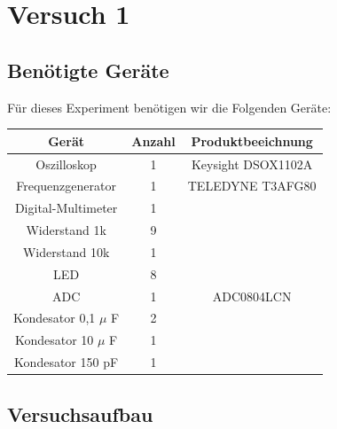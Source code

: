 \chapter{Versuch 1}

\section{Benötigte Geräte}

Für dieses Experiment benötigen wir die Folgenden Geräte:

\begin{tabular}[h]{c|c|c}
    Gerät & Anzahl & Produktbeeichnung\\
    \hline
    Oszilloskop & 1  & Keysight DSOX1102A\\
    \hline
    Frequenzgenerator & 1 & TELEDYNE T3AFG80\\
	\hline 
	Digital-Multimeter & 1 & \\
	\hline 
	Widerstand 1k & 9 &  \\
	\hline 
	Widerstand 10k & 1 &  \\
	\hline
	LED & 8 & \\
	\hline
	ADC & 1 & ADC0804LCN \\
	\hline
	Kondesator 0,1 $\mu$ F & 2 & \\
	\hline
	Kondesator 10 $\mu$ F & 1 & \\
	\hline
	Kondesator 150 pF & 1 & 
        \label{tab:Materialliste Versuch 1}
\end{tabular}

\section{Versuchsaufbau}

